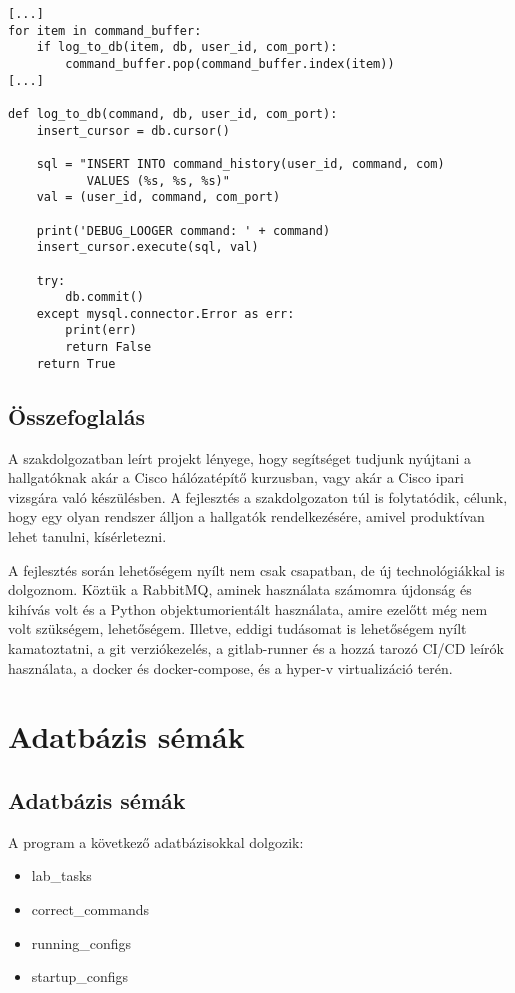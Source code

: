 \documentclass[12pt]{report}
\begin{document}
\begin{verbatim}
[...]
for item in command_buffer:
    if log_to_db(item, db, user_id, com_port):
        command_buffer.pop(command_buffer.index(item))
[...]

def log_to_db(command, db, user_id, com_port):
    insert_cursor = db.cursor()

    sql = "INSERT INTO command_history(user_id, command, com) 
           VALUES (%s, %s, %s)"
    val = (user_id, command, com_port)

    print('DEBUG_LOOGER command: ' + command)
    insert_cursor.execute(sql, val)

    try:
        db.commit()
    except mysql.connector.Error as err:
        print(err)
        return False
    return True
\end{verbatim}

\newpage

\section{Összefoglalás}

A szakdolgozatban leírt projekt lényege, hogy segítséget tudjunk nyújtani a hallgatóknak akár a Cisco hálózatépítő kurzusban, vagy akár a Cisco ipari vizsgára való készülésben. A fejlesztés a szakdolgozaton túl is folytatódik, célunk, hogy egy olyan rendszer álljon a hallgatók rendelkezésére, amivel produktívan lehet tanulni, kísérletezni.


A fejlesztés során lehetőségem nyílt nem csak csapatban, de új technológiákkal is dolgoznom. Köztük a RabbitMQ, aminek használata számomra újdonság és kihívás volt és a Python objektumorientált használata, amire ezelőtt még nem volt szükségem, lehetőségem. Illetve, eddigi tudásomat is lehetőségem nyílt kamatoztatni, a git verziókezelés, a gitlab-runner és a hozzá tarozó CI/CD leírók használata, a docker és docker-compose, és a hyper-v virtualizáció terén.

\chapter{Adatbázis sémák}
\section{Adatbázis sémák}


A program a következő adatbázisokkal dolgozik:

\singlespacing
\begin{itemize}
    \item lab\_tasks
    \item correct\_commands
    \item running\_configs
    \item startup\_configs
\end{itemize}
\end{document}
